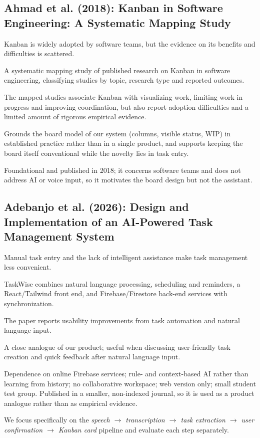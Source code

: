 \documentclass[11pt,a4paper]{article}
\newenvironment{sourceinfo}{\begin{description}[leftmargin=0pt,labelsep=0.5em,font=\normalfont\bfseries]}{\end{description}}
\newcommand{\source}[2]{\subsection{\texorpdfstring{#1~\cite{#2}}{#1}}}
\begin{document}
\source{Ahmad et al. (2018): Kanban in Software Engineering: A Systematic Mapping Study}{ahmad2018kanban}
\begin{sourceinfo}
  \item[Problem.] Kanban is widely adopted by software teams, but the evidence on its benefits and difficulties is scattered.
  \item[Method.] A systematic mapping study of published research on Kanban in software engineering, classifying studies by topic, research type and reported outcomes.
  \item[Reported findings.] The mapped studies associate Kanban with visualizing work, limiting work in progress and improving coordination, but also report adoption difficulties and a limited amount of rigorous empirical evidence.
  \item[Relevance.] Grounds the board model of our system (columns, visible status, WIP) in established practice rather than in a single product, and supports keeping the board itself conventional while the novelty lies in task entry.
  \item[Limitation for our project.] Foundational and published in 2018; it concerns software teams and does not address AI or voice input, so it motivates the board design but not the assistant.
\end{sourceinfo}

\source{Adebanjo et al. (2026): Design and Implementation of an AI-Powered Task Management System}{adebanjo2026taskwise}
\begin{sourceinfo}
  \item[Problem.] Manual task entry and the lack of intelligent assistance make task management less convenient.
  \item[Method.] TaskWise combines natural language processing, scheduling and reminders, a React/Tailwind front end, and Firebase/Firestore back-end services with synchronization.
  \item[Findings.] The paper reports usability improvements from task automation and natural language input.
  \item[Relevance.] A close analogue of our product; useful when discussing user-friendly task creation and quick feedback after natural language input.
  \item[Limitations.] Dependence on online Firebase services; rule- and context-based AI rather than learning from history; no collaborative workspace; web version only; small student test group. Published in a smaller, non-indexed journal, so it is used as a product analogue rather than as empirical evidence.
  \item[Our difference.] We focus specifically on the \emph{speech $\rightarrow$ transcription $\rightarrow$ task extraction $\rightarrow$ user confirmation $\rightarrow$ Kanban card} pipeline and evaluate each step separately.
\end{sourceinfo}
\end{document}
